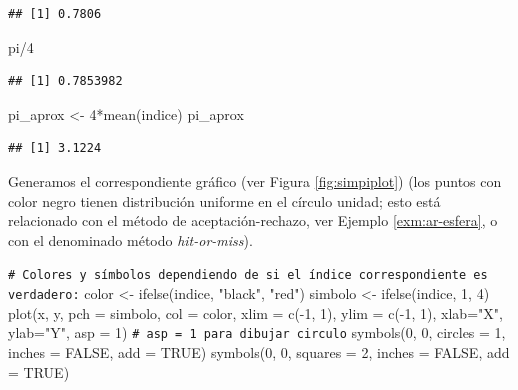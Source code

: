 \documentclass[
]{book}
\newenvironment{Shaded}{\begin{snugshade}}{\end{snugshade}}
\newcommand{\AttributeTok}[1]{\textcolor[rgb]{0.77,0.63,0.00}{#1}}
\newcommand{\CommentTok}[1]{\textcolor[rgb]{0.56,0.35,0.01}{\textit{#1}}}
\newcommand{\ConstantTok}[1]{\textcolor[rgb]{0.00,0.00,0.00}{#1}}
\newcommand{\DecValTok}[1]{\textcolor[rgb]{0.00,0.00,0.81}{#1}}
\newcommand{\FunctionTok}[1]{\textcolor[rgb]{0.00,0.00,0.00}{#1}}
\newcommand{\NormalTok}[1]{#1}
\newcommand{\OtherTok}[1]{\textcolor[rgb]{0.56,0.35,0.01}{#1}}
\newcommand{\SpecialCharTok}[1]{\textcolor[rgb]{0.00,0.00,0.00}{#1}}
\newcommand{\StringTok}[1]{\textcolor[rgb]{0.31,0.60,0.02}{#1}}
\theoremstyle{break}
\theoremstyle{nonumberplain}
\renewcommand{\CommentTok}[1]{\textcolor[rgb]{0.41,0.41,0.41}{\texttt{#1}}}
\begin{document}
\begin{verbatim}
## [1] 0.7806
\end{verbatim}

\begin{Shaded}
\begin{Highlighting}[]
\NormalTok{pi}\SpecialCharTok{/}\DecValTok{4}
\end{Highlighting}
\end{Shaded}

\begin{verbatim}
## [1] 0.7853982
\end{verbatim}

\begin{Shaded}
\begin{Highlighting}[]
\NormalTok{pi\_aprox }\OtherTok{\textless{}{-}} \DecValTok{4}\SpecialCharTok{*}\FunctionTok{mean}\NormalTok{(indice)}
\NormalTok{pi\_aprox}
\end{Highlighting}
\end{Shaded}

\begin{verbatim}
## [1] 3.1224
\end{verbatim}

Generamos el correspondiente gráfico (ver Figura \ref{fig:simpiplot}) (los puntos con color negro tienen distribución uniforme en el círculo unidad; esto está relacionado con el método de aceptación-rechazo, ver Ejemplo \ref{exm:ar-esfera}, o con el denominado método \emph{hit-or-miss}).

\begin{Shaded}
\begin{Highlighting}[]
\CommentTok{\# Colores y símbolos dependiendo de si el índice correspondiente es verdadero:}
\NormalTok{color }\OtherTok{\textless{}{-}} \FunctionTok{ifelse}\NormalTok{(indice, }\StringTok{"black"}\NormalTok{, }\StringTok{"red"}\NormalTok{) }
\NormalTok{simbolo }\OtherTok{\textless{}{-}} \FunctionTok{ifelse}\NormalTok{(indice, }\DecValTok{1}\NormalTok{, }\DecValTok{4}\NormalTok{)}
\FunctionTok{plot}\NormalTok{(x, y, }\AttributeTok{pch =}\NormalTok{ simbolo, }\AttributeTok{col =}\NormalTok{ color, }
     \AttributeTok{xlim =} \FunctionTok{c}\NormalTok{(}\SpecialCharTok{{-}}\DecValTok{1}\NormalTok{, }\DecValTok{1}\NormalTok{), }\AttributeTok{ylim =} \FunctionTok{c}\NormalTok{(}\SpecialCharTok{{-}}\DecValTok{1}\NormalTok{, }\DecValTok{1}\NormalTok{), }\AttributeTok{xlab=}\StringTok{"X"}\NormalTok{, }\AttributeTok{ylab=}\StringTok{"Y"}\NormalTok{, }\AttributeTok{asp =} \DecValTok{1}\NormalTok{) }
     \CommentTok{\# asp = 1 para dibujar circulo}
\FunctionTok{symbols}\NormalTok{(}\DecValTok{0}\NormalTok{, }\DecValTok{0}\NormalTok{, }\AttributeTok{circles =} \DecValTok{1}\NormalTok{, }\AttributeTok{inches =} \ConstantTok{FALSE}\NormalTok{, }\AttributeTok{add =} \ConstantTok{TRUE}\NormalTok{)}
\FunctionTok{symbols}\NormalTok{(}\DecValTok{0}\NormalTok{, }\DecValTok{0}\NormalTok{, }\AttributeTok{squares =} \DecValTok{2}\NormalTok{, }\AttributeTok{inches =} \ConstantTok{FALSE}\NormalTok{, }\AttributeTok{add =} \ConstantTok{TRUE}\NormalTok{)}
\end{Highlighting}
\end{Shaded}
\end{document}
